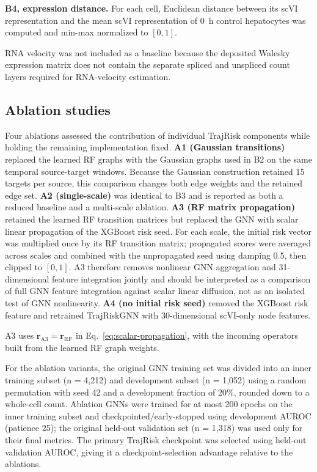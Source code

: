 \textbf{B4, expression distance.} For each cell, Euclidean distance between its scVI representation and the mean scVI representation of 0~h control hepatocytes was computed and min-max normalized to \([0,1]\).

RNA velocity was not included as a baseline because the deposited Walesky expression matrix does not contain the separate spliced and unspliced count layers required for RNA-velocity estimation.

\subsection*{Ablation studies}

Four ablations assessed the contribution of individual TrajRisk components while holding the remaining implementation fixed. \textbf{A1 (Gaussian transitions)} replaced the learned RF graphs with the Gaussian graphs used in B2 on the same temporal source-target windows. Because the Gaussian construction retained 15 targets per source, this comparison changes both edge weights and the retained edge set. \textbf{A2 (single-scale)} was identical to B3 and is reported as both a reduced baseline and a multi-scale ablation. \textbf{A3 (RF matrix propagation)} retained the learned RF transition matrices but replaced the GNN with scalar linear propagation of the XGBoost risk seed. For each scale, the initial risk vector was multiplied once by its RF transition matrix; propagated scores were averaged across scales and combined with the unpropagated seed using damping 0.5, then clipped to \([0,1]\). A3 therefore removes nonlinear GNN aggregation and 31-dimensional feature integration jointly and should be interpreted as a comparison of full GNN feature integration against scalar linear diffusion, not as an isolated test of GNN nonlinearity. \textbf{A4 (no initial risk seed)} removed the XGBoost risk feature and retrained TrajRiskGNN with 30-dimensional scVI-only node features.

A3 uses \(\boldsymbol r_{\mathrm{A3}}=\boldsymbol r_{\mathrm{RF}}\) in Eq.~\eqref{eq:scalar-propagation}, with the incoming operators built from the learned RF graph weights.

For the ablation variants, the original GNN training set was divided into an inner training subset (n = 4,212) and development subset (n = 1,052) using a random permutation with seed 42 and a development fraction of 20\%, rounded down to a whole-cell count. Ablation GNNs were trained for at most 200 epochs on the inner training subset and checkpointed/early-stopped using development AUROC (patience 25); the original held-out validation set (n = 1,318) was used only for their final metrics. The primary TrajRisk checkpoint was selected using held-out validation AUROC, giving it a checkpoint-selection advantage relative to the ablations.

